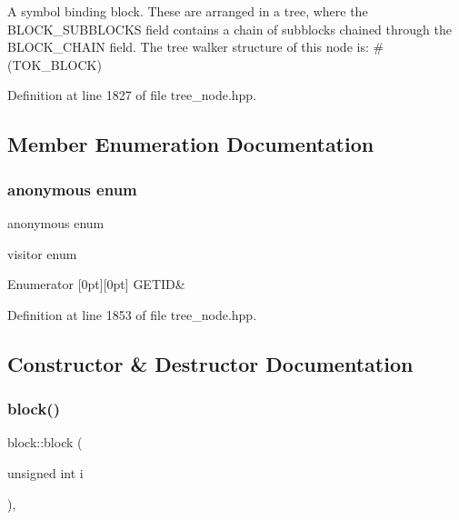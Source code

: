 A symbol binding block. These are arranged in a tree, where the B\+L\+O\+C\+K\+\_\+\+S\+U\+B\+B\+L\+O\+C\+KS field contains a chain of subblocks chained through the B\+L\+O\+C\+K\+\_\+\+C\+H\+A\+IN field. The tree walker structure of this node is\+: \#(T\+O\+K\+\_\+\+B\+L\+O\+CK) 

Definition at line 1827 of file tree\+\_\+node.\+hpp.



\subsection{Member Enumeration Documentation}
\mbox{\label{structblock_ae1ef495b1cde98b628a2ce9d9f9e9d8e}} 
\subsubsection{\texorpdfstring{anonymous enum}{anonymous enum}}
{\footnotesize\ttfamily anonymous enum}



visitor enum 

\begin{DoxyEnumFields}{Enumerator}
[0pt][0pt]{}\mbox{\label{structblock_ae1ef495b1cde98b628a2ce9d9f9e9d8ea51786bdb1e36f744d633f4881014fa9a}} 
G\+E\+T\+ID&\\
\hline

\end{DoxyEnumFields}


Definition at line 1853 of file tree\+\_\+node.\+hpp.



\subsection{Constructor \& Destructor Documentation}
\mbox{\label{structblock_ae28c301a1664fe41e9755c141b697d62}} 
\subsubsection{\texorpdfstring{block()}{block()}}
{\footnotesize\ttfamily block\+::block (\begin{DoxyParamCaption}\item[{unsigned int}]{i }\end{DoxyParamCaption})\hspace{0.3cm}{\ttfamily [inline]}, {\ttfamily [explicit]}}



